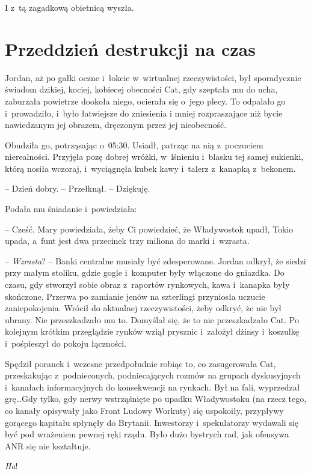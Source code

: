 \documentclass[oneside,polish,11pt,sfheadings]{mwbk}
\begin{document}
I z~tą zagadkową obietnicą wyszła.

\chapter{Przeddzień destrukcji na czas}

Jordan, aż po gałki oczne i~łokcie w~wirtualnej rzeczywistości, był
sporadycznie świadom dzikiej, kociej, kobiecej obecności Cat, gdy
szeptała mu do ucha, zaburzała powietrze dookoła niego, ocierała się o~jego plecy. To odpalało go i~prowadziło, i~było łatwiejsze do zniesienia
i mniej rozpraszające niż bycie nawiedzanym jej obrazem, dręczonym przez
jej nieobecność.

Obudziła go, potrząsając o~05:30. Usiadł, patrząc na nią z~poczuciem
nierealności. Przyjęła pozę dobrej wróżki, w~lśnieniu i~blasku tej samej
sukienki, którą nosiła wczoraj, i~wyciągnęła kubek kawy i~talerz z~kanapką z~bekonem.

-- Dzień dobry. -- Przełknął. -- Dziękuję.

Podała mu śniadanie i~powiedziała: 

-- Cześć. Mary powiedziała, żeby Ci
powiedzieć, że Władywostok upadł, Tokio upada, a~funt jest dwa przecinek
trzy miliona do marki i~wzrasta.

-- \emph{Wzrasta}? -- Banki centralne musiały być zdesperowane. Jordan
odkrył, że siedzi przy małym stoliku, gdzie gogle i~komputer były
włączone do gniazdka. Do czasu, gdy stworzył sobie obraz z~raportów
rynkowych, kawa i~kanapka były skończone. Przerwa po zamianie jenów na
szterlingi przyniosła uczucie zaniepokojenia. Wrócił do aktualnej
rzeczywistości, żeby odkryć, że nie był ubrany. Nie przeszkadzało mu to.
Domyślał się, że to nie przeszkadzało Cat. Po kolejnym krótkim
przeglądzie rynków wziął prysznic i~założył dżinsy i~koszulkę i~pośpieszył do pokoju łączności.

Spędził poranek i~wczesne przedpołudnie robiąc to, co zasugerowała Cat,
przeskakując z~podnieconych, podniecających rozmów na grupach
dyskusyjnych i~kanałach informacyjnych do konsekwencji na rynkach. Był
na fali, wyprzedzał grę\ldots Gdy tylko, gdy nerwy wstrząśnięte po upadku
Władywostoku (na rzecz tego, co kanały opisywały jako Front Ludowy
Workuty) się uspokoiły, przypływy gorącego kapitału spłynęły do
Brytanii. Inwestorzy i~spekulatorzy wydawali się być pod wrażeniem
pewnej ręki rządu. Było dużo bystrych rad, jak ofensywa ANR się nie
kształtuje.

\emph{Ha}!
\end{document}
